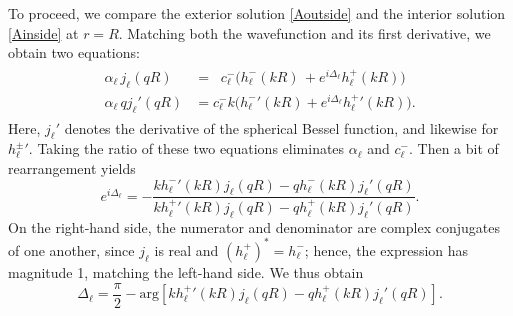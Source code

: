 \documentclass[prx,12pt]{revtex4-2}
\begin{document}
To proceed, we compare the exterior solution \eqref{Aoutside} and the
interior solution \eqref{Ainside} at $r = R$.  Matching both the
wavefunction and its first derivative, we obtain two equations:
\begin{align}
  \begin{aligned} \alpha_\ell\, j_\ell(qR)
    &=\;\; c^-_\ell \Big(h^-_\ell(kR) \,
    + e^{i\Delta_\ell} h^+_\ell(kR)\Big) \\
    \alpha_\ell\, q j_\ell'(qR)
    &= c^-_\ell k \Big({h^-_\ell}'(kR) + e^{i\Delta_\ell} {h^+_\ell}'(kR)\Big).\end{aligned}
\end{align}
Here, $j_\ell'$ denotes the derivative of the spherical Bessel
function, and likewise for ${h_\ell^\pm}'$.  Taking the ratio of these
two equations eliminates $\alpha_\ell$ and $c_\ell^-$.  Then a bit of
rearrangement yields
\begin{equation}
  e^{i\Delta_\ell} = - \frac{k{h_\ell^-}'(kR) j_\ell(qR) - qh_\ell^-(kR)j_\ell'(qR)}{k{h_\ell^+}'(kR) j_\ell(qR) - qh_\ell^+(kR)j_\ell'(qR)}.
\end{equation}
On the right-hand side, the numerator and denominator are complex
conjugates of one another, since $j_\ell$ is real and $(h_\ell^+)^* =
h_\ell^-$; hence, the expression has magnitude 1, matching the
left-hand side.  We thus obtain
\begin{equation}
  \Delta_\ell
  = \frac{\pi}{2} - \mathrm{arg}\!\left[k{h_\ell^+}'(kR) j_\ell(qR) - qh_\ell^+(kR)j_\ell'(qR)\right].
  \label{slresult}
\end{equation}
\end{document}

